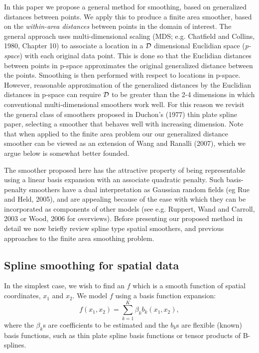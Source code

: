 \documentclass[useAMS, referee]{biom}
\begin{document}
In this paper we propose a general method for smoothing, based on generalized distances between points. We apply this to produce a finite area smoother, based on the \textit{within-area distances} between points in the domain of interest. The general approach uses multi-dimensional scaling (MDS; e.g. Chatfield and Collins, 1980, Chapter 10) to associate a location in a $\cal D$ dimensional Euclidian space ({\em p-space}) with each original data point. This is done so that the Euclidian distances between points in p-space approximates the original generalized distance between the points. Smoothing is then performed with respect to locations in p-space. However, reasonable approximation of the generalized distances by the Euclidian distances in p-space can require $\cal D$ to be greater than the 2-4 dimensions in which conventional multi-dimensional smoothers work well. For this reason we revisit the general class of smoothers proposed in Duchon's (1977) thin plate spline paper, selecting a smoother that behaves well with increasing dimension. Note that when applied to the finite area problem our our generalized distance smoother can be viewed as an extension of Wang and Ranalli (2007), which we argue below is somewhat better founded.

The smoother proposed here has the attractive property of being representable using a linear basis expansion with an associate quadratic penalty. Such basis-penalty smoothers have a dual interpretation as Gaussian random fields (eg Rue and Held, 2005), and are appealing because of the ease with which they can be incorporated as components of other models  
(see e.g. Ruppert, Wand and Carroll, 2003 or Wood, 2006 for overviews). Before presenting our proposed method in detail we now briefly review spline type spatial smoothers, and previous approaches to the finite area smoothing problem.

\subsection{Spline smoothing for spatial data}

In the simplest case, we wish to find an $f$ which is a smooth function of spatial coordinates, $x_1$ and $x_2$. We model $f$ using a basis function expansion:
\begin{equation}
f(x_{1}, x_{2}) = \sum_{k=1}^K \beta_k b_k(x_{1}, x_{2}),
\label{basis-exp}
\end{equation}
where the $\beta_k$s are coefficients to be estimated and the $b_k$s are flexible (known) basis functions, such as thin plate spline basis functions or tensor products of B-splines. 
\end{document}
